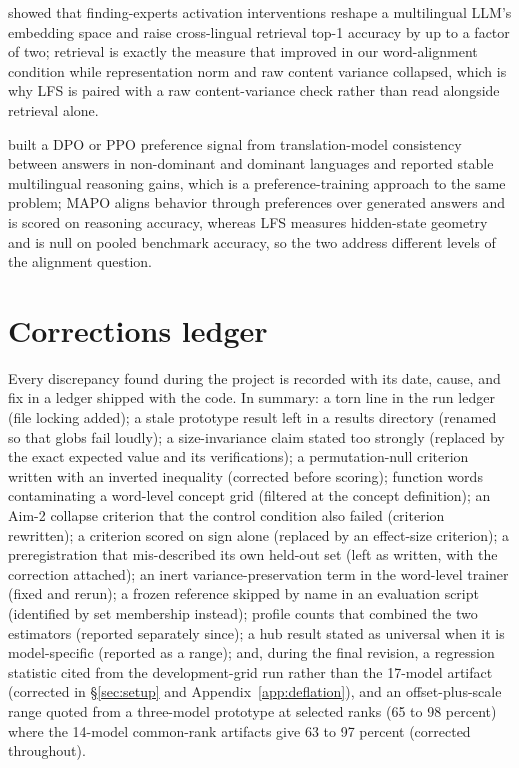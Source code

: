 \documentclass{article} %
\begin{document}
\citet{sundar2025steering} showed that finding-experts activation interventions reshape a multilingual LLM's embedding space and raise cross-lingual retrieval top-1 accuracy by up to a factor of two; retrieval is exactly the measure that improved in our word-alignment condition while representation norm and raw content variance collapsed, which is why LFS is paired with a raw content-variance check rather than read alongside retrieval alone.

\citet{she2024mapo} built a DPO or PPO preference signal from translation-model consistency between answers in non-dominant and dominant languages and reported stable multilingual reasoning gains, which is a preference-training approach to the same problem; MAPO aligns behavior through preferences over generated answers and is scored on reasoning accuracy, whereas LFS measures hidden-state geometry and is null on pooled benchmark accuracy, so the two address different levels of the alignment question.

\section{Corrections ledger}
\label{app:ledger}
Every discrepancy found during the project is recorded with its date, cause, and fix in a ledger shipped with the code. In summary: a torn line in the run ledger (file locking added); a stale prototype result left in a results directory (renamed so that globs fail loudly); a size-invariance claim stated too strongly (replaced by the exact expected value and its verifications); a permutation-null criterion written with an inverted inequality (corrected before scoring); function words contaminating a word-level concept grid (filtered at the concept definition); an Aim-2 collapse criterion that the control condition also failed (criterion rewritten); a criterion scored on sign alone (replaced by an effect-size criterion); a preregistration that mis-described its own held-out set (left as written, with the correction attached); an inert variance-preservation term in the word-level trainer (fixed and rerun); a frozen reference skipped by name in an evaluation script (identified by set membership instead); profile counts that combined the two estimators (reported separately since); a hub result stated as universal when it is model-specific (reported as a range); and, during the final revision, a regression statistic cited from the development-grid run rather than the 17-model artifact (corrected in \S\ref{sec:setup} and Appendix~\ref{app:deflation}), and an offset-plus-scale range quoted from a three-model prototype at selected ranks (65 to 98 percent) where the 14-model common-rank artifacts give 63 to 97 percent (corrected throughout).
\end{document}
